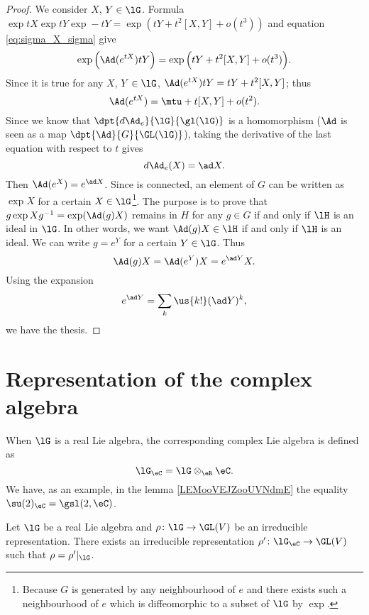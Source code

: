 \begin{proof}
We consider $X$, $Y\in\lG$. Formula $\exp tX\exp tY\exp-tY=\exp( tY+t^2[X,Y]+o(t^3) )$ and equation \eqref{eq:sigma_X_sigma} give
\[
   \exp\Big( \Ad(e^{tX})tY \Big)=\exp\Big(  tY+t^2[X,Y]+o(t^3)  \Big).
\]
Since it is true for any $X$, $Y\in\lG$, $\Ad(e^{tX})tY=tY+t^2[X,Y]$; thus
\begin{equation}
  \Ad(e^{tX})=\mtu+t[X,Y]+o(t^2).
\end{equation}
Since we know that $\dpt{d\Ad_e}{\lG}{\gl(\lG)}$ is a homomorphism ($\Ad$ is seen as a map $\dpt{\Ad}{G}{\GL(\lG)}$), taking the derivative of the last equation with respect to $t$ gives
\begin{equation}
  d\Ad_e(X)=\ad X.
\end{equation}
Then $\Ad(e^X)=e^{\ad X}$. Since is connected, an element of $G$ can be written as $\exp X$ for a certain $X\in\lG$\footnote{Because $G$ is generated by any neighbourhood of $e$ and there exists such a neighbourhood of $e$ which is diffeomorphic to a subset of $\lG$ by $\exp$.}. The purpose is to prove that $g\exp Xg^{-1}=\exp(\Ad(g)X)$ remains in $H$ for any $g\in G$ if and only if $\lH$ is an ideal in $\lG$. In other words, we want $\Ad(g)X\in\lH$ if and only if $\lH$ is an ideal. We can write $g=e^Y$ for a certain $Y\in\lG$. Thus
\[
  \Ad(g)X=\Ad(e^Y)X=e^{\ad Y}X.
\]
Using the expansion
\begin{equation}
e^{\ad Y}=\sum_k\us{k!}(\ad Y)^k,
\end{equation}
we have the thesis.
\end{proof}

\section{Representation of the complex algebra}

When \(\lG \) is a real Lie algebra, the corresponding complex Lie algebra is defined as
\begin{equation}
    \lG_{\eC}=\lG\otimes_{\eR}\eC.
\end{equation}
We have, as an example, in the lemma \ref{LEMooVEJZooUVNdmE} the equality $\su(2)_{\eC}=\gsl(2,\eC)$.

\begin{lemma}        \label{LEMooIGAFooTSUsJR}
    Let \( \lG\) be a real Lie algebra and \( \rho\colon \lG\to \GL(V)\) be an irreducible representation. There exists an irreducible representation \( \rho'\colon \lG_{\eC}\to \GL(V)\) such that \( \rho=\rho'|_{\lG}\).
\end{lemma}

